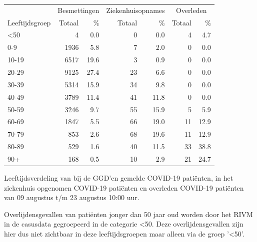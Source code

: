 \documentclass[
  english,
  man,floatsintext]{apa6}
\begin{document}
\begin{table}
\centering\begingroup\fontsize{11}{13}\selectfont

\begin{threeparttable}
\begin{tabular}{lrrrrrr}
\toprule
\multicolumn{1}{c}{ } & \multicolumn{2}{c}{Besmettingen} & \multicolumn{2}{c}{Ziekenhuisopnames} & \multicolumn{2}{c}{Overleden} \\
\cmidrule(l{3pt}r{3pt}){2-3} \cmidrule(l{3pt}r{3pt}){4-5} \cmidrule(l{3pt}r{3pt}){6-7}
Leeftijdsgroep & Totaal & \% & Totaal & \% & Totaal & \%\\
\midrule
<50 & 4 & 0.0 & 0 & 0.0 & 4 & 4.7\\
0-9 & 1936 & 5.8 & 7 & 2.0 & 0 & 0.0\\
10-19 & 6517 & 19.6 & 3 & 0.9 & 0 & 0.0\\
20-29 & 9125 & 27.4 & 23 & 6.6 & 0 & 0.0\\
30-39 & 5314 & 15.9 & 34 & 9.8 & 0 & 0.0\\
40-49 & 3789 & 11.4 & 41 & 11.8 & 0 & 0.0\\
50-59 & 3246 & 9.7 & 55 & 15.9 & 5 & 5.9\\
60-69 & 1847 & 5.5 & 66 & 19.0 & 11 & 12.9\\
70-79 & 853 & 2.6 & 68 & 19.6 & 11 & 12.9\\
80-89 & 529 & 1.6 & 40 & 11.5 & 33 & 38.8\\
90+ & 168 & 0.5 & 10 & 2.9 & 21 & 24.7\\
\bottomrule
\end{tabular}
\begin{tablenotes}
\item[1] Leeftijdsverdeling van bij de GGD’en gemelde COVID-19 patiënten, in het ziekenhuis opgenomen COVID-19 patiënten en overleden COVID-19 patiënten van 09 augustus t/m 23 augustus 10:00 uur.
\item[2] Overlijdensgevallen van patiënten jonger dan 50 jaar oud worden door het RIVM in de casusdata gegroepeerd in de categorie <50. Deze overlijdensgevallen zijn hier dus niet zichtbaar in deze leeftijdsgroepen maar alleen via de groep '<50'.
\end{tablenotes}
\end{threeparttable}
\endgroup{}
\end{table}

\newpage
\end{document}
